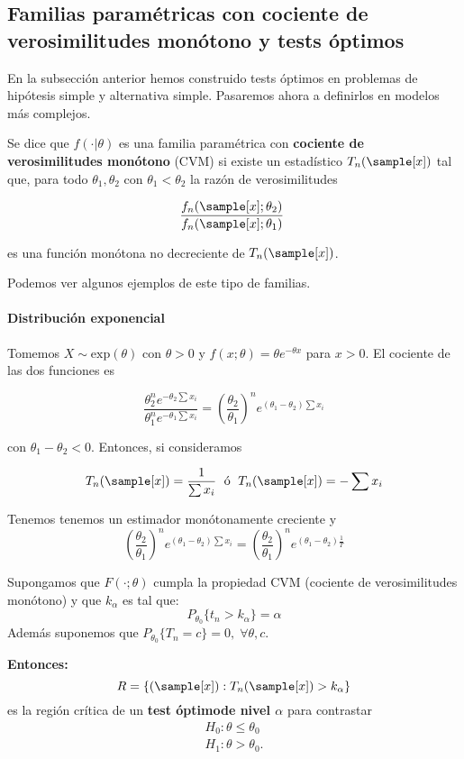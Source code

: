 \documentclass{apuntes}
\begin{document}
\newpage
\subsection{Familias paramétricas con cociente de verosimilitudes monótono y tests óptimos}

En la subsección anterior hemos construido tests óptimos en problemas de hipótesis simple y alternativa simple. Pasaremos ahora a definirlos en modelos más complejos.


\begin{defn} Se dice que $f(\cdot|\theta)$ es una familia paramétrica con \textbf{cociente de verosimilitudes monótono} (CVM) si existe un estadístico $T_n(\sample[x])$ tal que, para todo $\theta_1,\theta_2$ con $\theta_1 < \theta_2$ la razón de verosimilitudes

\[ \frac{f_n(\sample[x];\theta_2)}{f_n(\sample[x];\theta_1)} \]

es una función monótona no decreciente de $T_n(\sample[x])$.
\label{defFamCVM}
\end{defn}

Podemos ver algunos ejemplos de este tipo de familias.

\paragraph{Distribución exponencial}

Tomemos $X\sim \text{exp}(\theta)$ con $\theta > 0$ y $f(x;\theta) = \theta e^{-\theta x}$ para $x > 0$. El cociente de las dos funciones es

\[
\frac{\theta_2^ne^{-\theta_2 \sum x_i}}{\theta_1^ne^{-\theta_1\sum x_i}} =
\left(\frac{\theta_2}{\theta_1}\right)^n e^{(\theta_1 - \theta_2)\sum x_i }
\]

con $\theta_1-\theta_2 < 0$. Entonces, si consideramos

\begin{gather*}
T_n(\sample[x]) = \frac{1}{\sum x_i}
\; \text{ ó } \;
T_n(\sample[x]) = -\sum x_i
\end{gather*}

Tenemos tenemos un estimador monótonamente creciente y
\[
\left(\frac{\theta_2}{\theta_1}\right)^n e^{(\theta_1 - \theta_2)\sum x_i } =
\left(\frac{\theta_2}{\theta_1}\right)^n e^{(\theta_1 - \theta_2)\frac{1}{T} }
\]

\begin{theorem}\label{thmNeymanPearson2}
Supongamos que $F(\cdot;\theta)$ cumpla la propiedad CVM (cociente de verosimilitudes monótono) y que $k_{\alpha}$ es tal que:
\[P_{\theta_0} \{t_n > k_{\alpha}\} = \alpha\]
Además suponemos que $P_{\theta_0} \{T_n = c\} = 0, \; \forall \theta,c$.

\noindent \textbf{Entonces:}
\[ R=\{(\sample[x]): T_n(\sample[x]) > k_{\alpha}\}\]
es la región crítica de un \textbf{test óptimo\footnotemark de nivel $\alpha$} para contrastar
\begin{gather*}
H_0: \theta \leq \theta_0\\
H_1: \theta > \theta_0.
\end{gather*}
\end{theorem}
\end{document}
